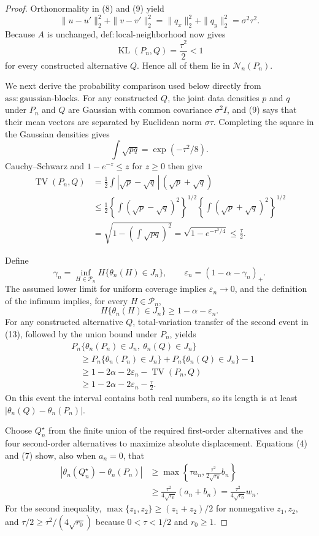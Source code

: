 \documentclass{article}
\begin{document}
\begin{proof}
Orthonormality in (8) and (9) yield
\[
\|u-u'\|_2^2+\|v-v'\|_2^2
=\|q_x\|_2^2+\|q_y\|_2^2
=\sigma^2\tau^2.
\]
Because \(A\) is unchanged, \(\mathrm{def{:}local\mbox{-}neighborhood}\) now gives
\[
\operatorname{KL}(P_n,Q)=\frac{\tau^2}{2}<1 \tag{11}
\]
for every constructed alternative \(Q\).  Hence all of them lie in \(\mathcal N_n(P_n)\).

We next derive the probability comparison used below directly from \(\mathrm{ass{:}gaussian\mbox{-}blocks}\).  For any constructed \(Q\), the joint data densities \(p\) and \(q\) under \(P_n\) and \(Q\) are Gaussian with common covariance \(\sigma^2I\), and (9) says that their mean vectors are separated by Euclidean norm \(\sigma\tau\).  Completing the square in the Gaussian densities gives
\[
\int\sqrt{pq}=\exp(-\tau^2/8).
\]
Cauchy--Schwarz and \(1-e^{-z}\leq z\) for \(z\geq0\) then give
\[
\begin{aligned}
\operatorname{TV}(P_n,Q)
&=\frac12\int|\sqrt p-\sqrt q\,|\,(\sqrt p+\sqrt q)\\
&\leq\frac12
\left\{\int(\sqrt p-\sqrt q)^2\right\}^{1/2}
\left\{\int(\sqrt p+\sqrt q)^2\right\}^{1/2}\\
&=\sqrt{1-\left(\int\sqrt{pq}\right)^2}
=\sqrt{1-e^{-\tau^2/4}}
\leq\frac\tau2. 
\end{aligned} \tag{12}
\]

Define
\[
\gamma_n=\inf_{H\in\mathcal P_n}H\{\theta_n(H)\in J_n\},
\qquad
\varepsilon_n=(1-\alpha-\gamma_n)_+.
\]
The assumed lower limit for uniform coverage implies \(\varepsilon_n\to0\), and the definition of the infimum implies, for every \(H\in\mathcal P_n\),
\[
H\{\theta_n(H)\in J_n\}\geq1-\alpha-\varepsilon_n. \tag{13}
\]
For any constructed alternative \(Q\), total-variation transfer of the second event in (13), followed by the union bound under \(P_n\), yields
\[
\begin{aligned}
&P_n\{\theta_n(P_n)\in J_n,\ \theta_n(Q)\in J_n\}\\
&\quad\geq
P_n\{\theta_n(P_n)\in J_n\}
+P_n\{\theta_n(Q)\in J_n\}-1\\
&\quad\geq1-2\alpha-2\varepsilon_n-\operatorname{TV}(P_n,Q)\\
&\quad\geq1-2\alpha-2\varepsilon_n-\frac\tau2. 
\end{aligned} \tag{14}
\]
On this event the interval contains both real numbers, so its length is at least \(|\theta_n(Q)-\theta_n(P_n)|\).

Choose \(Q_n^\star\) from the finite union of the required first-order alternatives and the four second-order alternatives to maximize absolute displacement.  Equations (4) and (7) show, also when \(a_n=0\), that
\[
\begin{aligned}
|\theta_n(Q_n^\star)-\theta_n(P_n)|
&\geq\max\left\{\tau a_n,\frac{\tau^2}{2\sqrt{r_0}}b_n\right\}\\
&\geq\frac{\tau^2}{4\sqrt{r_0}}(a_n+b_n)
=\frac{\tau^2}{4\sqrt{r_0}}w_n. 
\end{aligned} \tag{15}
\]
For the second inequality, \(\max\{z_1,z_2\}\geq(z_1+z_2)/2\) for nonnegative \(z_1,z_2\), and \(\tau/2\geq\tau^2/(4\sqrt{r_0})\) because \(0<\tau<1/2\) and \(r_0\geq1\).


\end{proof}
\end{document}

